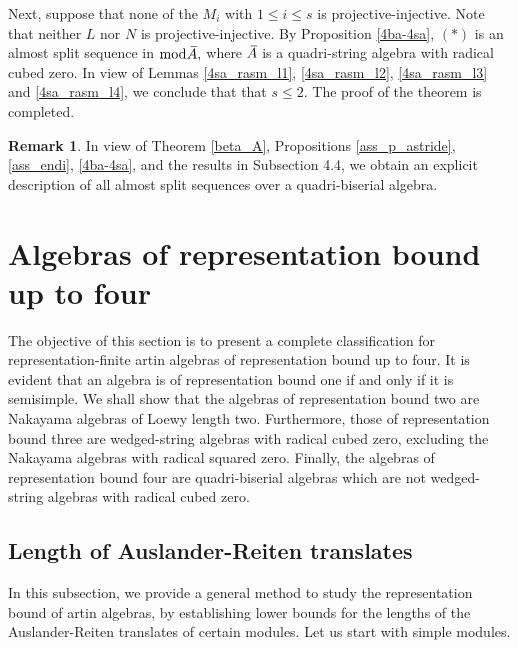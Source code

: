 \documentclass[10pt]{amsart}
\theoremstyle{definition}
\newtheorem{Remark}[Theo]{Remark}
\newcommand{\mmod}{{\rm mod}}
\begin{document}
Next, suppose that none of the $M_i$ with $1\le i\le s$ is projective-injective. Note that  neither $L$ nor $N$ is projective-injective. By Proposition \ref{4ba-4sa}, $(*)$ is an almost split sequence in $\mmod \hspace{3pt}\overline{\hspace{-2.8pt}A},$ where $\hspace{2pt}\overline{\hspace{-2.8pt}A}$ is a quadri-string algebra with radical cubed zero.  In view of Lemmas \ref{4sa_rasm_l1}, \ref{4sa_rasm_l2}, \ref{4sa_rasm_l3} and \ref{4sa_rasm_l4}, we conclude that that $s\le 2.$ The proof of the theorem is completed.

\smallskip

\begin{Remark} 

In view of Theorem \ref{beta_A}, Propositions \ref{ass_p_astride}, \ref{ass_endi}, \ref{4ba-4sa}, and the results in Subsection 4.4, we obtain an explicit description of all almost split sequences over a quadri-biserial algebra.

\end{Remark}


\section{\sc Algebras of representation bound up to four}

The objective of this section is to present a complete classification for representa\-tion-finite artin algebras of representation bound up to four. It is evident that an algebra is of representation bound one if and only if it is semisimple. We shall show that the algebras of representation bound two are Nakayama algebras of Loewy length two. Furthermore, those of representation bound three are wedged-string algebras with radical cubed zero, excluding the Nakayama algebras with radical squared zero. Finally, the algebras of representation bound four are quadri-biserial algebras which are not wedged-string algebras with radical cubed zero.

\subsection{\sc Length of Auslander-Reiten translates} In this subsection, we provide a general method to study the representation bound of artin algebras, by establishing lower bounds for the lengths of the Auslander-Reiten translates of certain modules. Let us start with simple modules.
\end{document}

